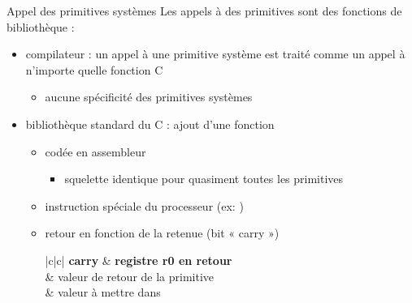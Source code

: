 \begin {frame} {Appel des primitives systèmes}
    Les appels à des primitives sont des fonctions de bibliothèque :
    \begin {itemize}
	\item compilateur : un appel à une primitive
	    système est traité comme un appel à n'importe quelle
	    fonction C

	    \begin {itemize}
		\item aucune spécificité des primitives systèmes
	    \end {itemize}

	\item bibliothèque standard du C : ajout d'une fonction

	    \begin {itemize}
		\item codée en assembleur
		    \begin {itemize}
			\item squelette identique pour quasiment
			    toutes les primitives
		    \end {itemize}
		\item instruction spéciale du processeur (ex: )
		\item retour en fonction de la retenue (bit « carry »)

		    \ctableau {\fD} {|c|c|} {
			\rca \textbf {carry} & \textbf {registre r0 en retour}
			    \\
			 & valeur de retour de la primitive \\
			 & valeur à mettre dans  \\
		    }
	    \end {itemize}
    \end {itemize}
\end {frame}



